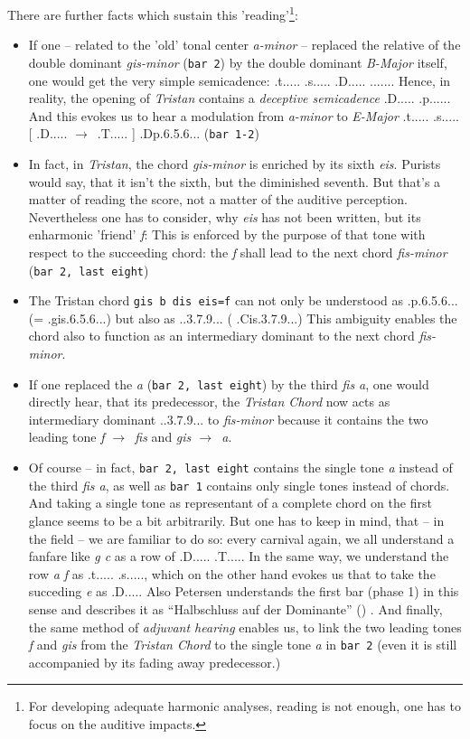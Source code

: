 \documentclass[
  DIV=calc,
  BCOR=5mm,
  12pt,
  headings=small,
  oneside,
  abstract=true,
  toc=bib,
  xcolor=dvipsnames,
  openany,
  ngerman,english]{scrartcl}
\newcommand{\acc}[0]{\textit}
\newcommand{\ra}[0]{$\rightarrow$}
\begin{document}
There are further facts which sustain this 'reading'\footnote{For developing
adequate harmonic analyses, reading is not enough, one has to focus on the
auditive impacts.}:
\begin{itemize}
  \item If one -- related to the 'old' tonal center \acc{a-minor} -- replaced
  the relative of the double dominant \acc{gis-minor} (\texttt{bar 2}) by the
  double dominant \acc{B-Major} itself, one would get the very simple
  semicadence: \HH.t..... \HH.s..... \HH.D..... \HH.\DD...... Hence, in reality,
  the opening of \acc{Tristan} contains a \acc{deceptive semicadence} \HH.D.....
  \HH.{\DD}p...... And this evokes us to hear a modulation
  from \acc{a-minor} to \acc{E-Major} \HH.t..... \HH.s..... [ \HH.D..... \ra\ 
  \HH.T..... ] \HH.Dp.6.5.6... (\texttt{bar 1-2})
  \item In fact, in \acc{Tristan}, the chord \acc{gis-minor} is enriched by its
  sixth \acc{eis}. Purists would say, that it isn't the sixth, but the
  diminished seventh. But that's a matter of reading the score, not a matter of
  the auditive perception. Nevertheless one has to consider, why \acc{eis} has
  not been written, but its enharmonic 'friend' \acc{f}: This is enforced by the
  purpose of that tone with respect to the succeeding chord: the \acc{f} shall
  lead to the next chord \acc{fis-minor} (\texttt{bar 2, last eight}) 
  \item The Tristan chord \texttt{gis b dis eis=f}  can not only be understood
  as \HH.{\DD}p.6.5.6... (= \HH.gis.6.5.6...) but also as \HH.\Dohne.3.7.9... (
  \HH.\Ohne[0,2em]Cis.3.7.9...) This ambiguity enables the chord also to
  function as an intermediary dominant to the next chord \acc{fis-minor}.
  \item If one replaced the \acc{a} (\texttt{bar 2, last eight}) by the third
  \acc{fis a}, one would directly hear, that its predecessor, the \acc{Tristan
  Chord} now acts as intermediary dominant \HH.\Dohne.3.7.9... to
  \acc{fis-minor} because it contains the two leading tone \acc{f \ra\ fis} and
  \acc{gis \ra\ a}.
  \item Of course -- in fact, \texttt{bar 2, last eight} contains the single tone
  \acc{a} instead of the third  \acc{fis a}, as well as \texttt{bar 1} contains
  only single tones instead of chords. And taking a single tone as representant
  of a complete chord on the first glance seems to be a bit arbitrarily. But one
  has to keep in mind, that -- in the field -- we are familiar to do so: every
  carnival again, we all understand a fanfare like \acc{g c} as a row of
  \HH.D..... \HH.T..... In the same way, we understand the row \acc{a f} as
  \HH.t..... \HH.s....., which on the other hand evokes us that to take the
  succeding \acc{e} as \HH.D..... Also Petersen understands the first bar (phase
  1) in this sense and describes it as \enquote{Halbschluss auf der Dominante}
  (\cite[cf.][51]{Petersen2019a}) .
  And finally, the same method of \acc{adjuvant hearing} enables us, to link the
  two leading tones \acc{f} and \acc{gis} from the \acc{Tristan Chord} to the
  single tone \acc{a} in \texttt{bar 2} (even it is still accompanied by its
  fading away predecessor.)
\end{itemize}
\end{document}
